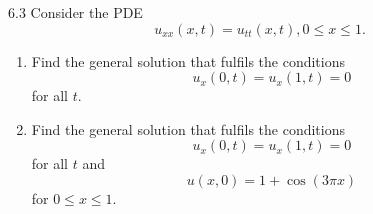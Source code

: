 
\begin{problem}{6.3}
  Consider the PDE
\[ 
u_{xx} (x,t) = u_{t t}(x,t), 0 \leq x \leq 1
.\]
\begin{enumerate}[label=(\alph*)]
  \item Find the general solution that fulfils the conditions
\[ 
u_x(0,t) = u_x(1,t) = 0
\]
for all $t$. 
\item Find the general solution that fulfils the conditions
  \begin{equation*}
    u_x(0,t) = u_x(1,t ) = 0
  \end{equation*}
  for all $t$ and
  \begin{equation*}
    u(x,0) = 1 + \cos(3 \pi x)
  \end{equation*}
  for $0 \leq x \leq 1$.
\end{enumerate}
\end{problem}

